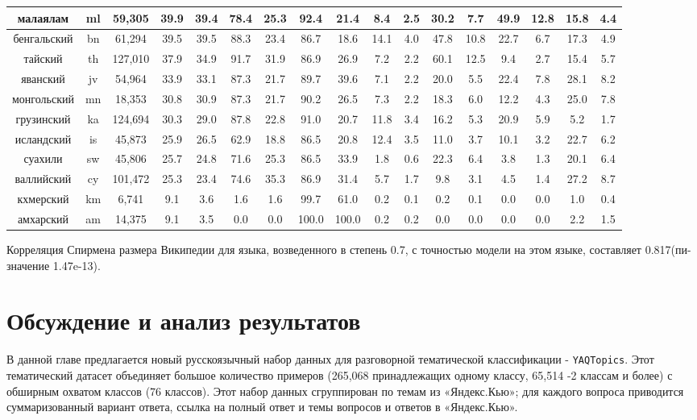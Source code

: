 \begin{table*}
{\begin{tabular}{|c|c|c||c|c|c|c|c|c|c|c|c|c|c|c|c|c|}
малаялам & ml & 59,305 & 39.9 & 39.4 & 78.4 & 25.3 & 92.4 & 21.4 & 8.4 & 2.5 & 30.2 & 7.7 & 49.9 & 12.8 & 15.8 & 4.4\\ \hline
бенгальский & bn & 61,294 & 39.5 & 39.5 & 88.3 & 23.4 & 86.7 & 18.6 & 14.1 & 4.0 & 47.8 & 10.8 & 22.7 & 6.7 & 17.3 & 4.9\\ \hline
тайский & th & 127,010 & 37.9 & 34.9 & 91.7 & 31.9 & 86.9 & 26.9 & 7.2 & 2.2 & 60.1 & 12.5 & 9.4 & 2.7 & 15.4 & 5.7\\ \hline
яванский & jv & 54,964 & 33.9 & 33.1 & 87.3 & 21.7 & 89.7 & 39.6 & 7.1 & 2.2 & 20.0 & 5.5 & 22.4 & 7.8 & 28.1 & 8.2\\ \hline
монгольский & mn & 18,353 & 30.8 & 30.9 & 87.3 & 21.7 & 90.2 & 26.5 & 7.3 & 2.2 & 18.3 & 6.0 & 12.2 & 4.3 & 25.0 & 7.8\\ \hline
грузинский & ka & 124,694 & 30.3 & 29.0 & 87.8 & 22.8 & 91.0 & 20.7 & 11.8 & 3.4 & 16.2 & 5.3 & 20.9 & 5.9 & 5.2 & 1.7\\ \hline
исландский & is & 45,873 & 25.9 & 26.5 & 62.9 & 18.8 & 86.5 & 20.8 & 12.4 & 3.5 & 11.0 & 3.7 & 10.1 & 3.2 & 22.7 & 6.2\\ \hline
суахили & sw & 45,806 & 25.7 & 24.8 & 71.6 & 25.3 & 86.5 & 33.9 & 1.8 & 0.6 & 22.3 & 6.4 & 3.8 & 1.3 & 20.1 & 6.4\\ \hline
валлийский & cy & 101,472 & 25.3 & 23.4 & 74.6 & 35.3 & 86.9 & 31.4 & 5.7 & 1.7 & 9.8 & 3.1 & 4.5 & 1.4 & 27.2 & 8.7\\ \hline
кхмерский & km & 6,741 & 9.1 & 3.6 & 1.6 & 1.6 & 99.7 & 61.0 & 0.2 & 0.1 & 0.2 & 0.1 & 0.0 & 0.0 & 1.0 & 0.4\\ \hline
амхарский & am & 14,375 & 9.1 & 3.5 & 0.0 & 0.0 & 100.0 & 100.0 & 0.2 & 0.2 & 0.0 & 0.0 & 0.0 & 0.0 & 2.2 & 1.5\\ \hline
\end{tabular}
}
\end{table*}
Корреляция Спирмена размера Википедии для языка, возведенного в степень 0.7, с точностью модели на этом языке, составляет 0.817(пи-значение 1.47e-13).


\section{Обсуждение и анализ результатов} 

В данной главе предлагается новый русскоязычный набор данных для разговорной тематической классификации - \texttt{YAQTopics}. Этот тематический датасет объединяет большое количество примеров (265,068 принадлежащих одному классу, 65,514 -2 классам и более) с обширным охватом классов (76 классов). Этот набор данных сгруппирован по темам из «Яндекс.Кью»; для каждого вопроса приводится суммаризованный вариант ответа, ссылка на полный ответ и темы вопросов и ответов в «Яндекс.Кью».

